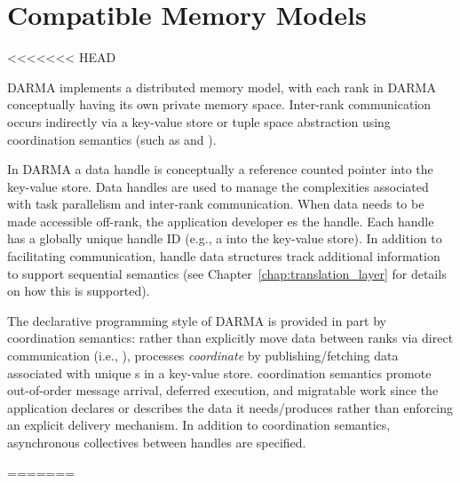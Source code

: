 
\section{Compatible Memory Models}
<<<<<<< HEAD
\label{sec:memmodel}

\gls{DARMA} implements a \gls{distributed memory model}, with each \gls{rank}
in \gls{DARMA} conceptually having its own private memory space. 
Inter-\gls{rank} communication occurs indirectly via a 
\gls{key-value store} or \gls{tuple space} abstraction using
\gls{coordination semantics} (such as  and
). 

In \gls{DARMA} a data \gls{handle} is conceptually a \gls{reference counted pointer} into the
\gls{key-value store}.  Data \glspl{handle} are used to manage the
complexities associated with \gls{task parallelism} and inter-\gls{rank} communication.  
When data needs to be made accessible off-\gls{rank}, the application developer 
es the \gls{handle}.  Each \gls{handle} has a globally unique handle ID
(e.g., a  into the \gls{key-value store}).  
In addition to facilitating communication, \gls{handle} data structures track
additional information to support \gls{sequential semantics} (see Chapter~\ref{chap:translation_layer} for details on how this is supported).

The \gls{declarative} programming style of \gls{DARMA} is provided in part by \gls{coordination
semantics}:  rather than explicitly move data between \glspl{rank} via direct communication
(i.e.,  ), processes \emph{coordinate} by
publishing/fetching data associated with unique s in a
\gls{key-value store}.
\Gls{coordination semantics} promote out-of-order message arrival,
\gls{deferred execution}, and \gls{migratable} work 
since the application declares or describes the data it needs/produces rather than enforcing an explicit delivery mechanism.
In addition to \gls{coordination semantics}, \gls{asynchronous} collectives
between \glspl{handle} are specified. 



=======
\label{sec:mem_model}

